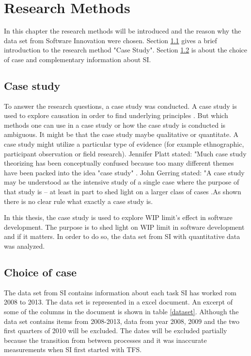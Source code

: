 \documentclass[UKenglish]{ifimaster}  %
\begin{document}
\chapter{Research Methods}
\label{chap:RM}
In this chapter the research methods will be introduced and the reason why the data set from Software Innovation were chosen. Section \ref{sec:CS} gives a brief introduction to the research method "Case Study".  Section \ref{sec:coc} is about the choice of case and complementary information about SI. 


\section{Case study}
\label{sec:CS}
To answer the research questions, a case study was conducted.  A case study is used to explore causation in order to find underlying principles \parencite{0078285763}\parencite{9781412960991}.  But which methods one can use in a case study or how the case study is conducted is ambiguous.  It might be that the case study maybe qualitative or quantitate.  A case study might utilize a particular type of evidence (for example ethnographic, participant observation or field research).  Jennifer Platt stated: "Much case study theorizing has been conceptually confused because too many different themes have been packed into the idea "case study" \parencite{0521676568}.  John Gerring stated: "A case study may be understood as the intensive study of a single case where the purpose of that study is -- at least in part to shed light on a larger class of cases  \parencite{0521676568}.As shown there is no clear rule what exactly a case study is.


In this thesis, the case study is used to explore WIP limit's effect in software development. The purpose is to shed light on WIP limit in software development and if it matters. In order to do so, the data set from SI with quantitative data was analyzed.

\section{Choice of case}
\label{sec:coc}
The data set from SI contains information about each task SI has worked rom 2008 to 2013. The data set is represented in a excel document. An excerpt of some of the columns in the document is shown in table \ref{dataset}. Although the data set contains items from 2008-2013, data from year 2008, 2009 and the two first quarters of 2010 will be excluded. The dates will be excluded partially because the transition from between processes and it was inaccurate measurements when SI first started with TFS.
\end{document}
